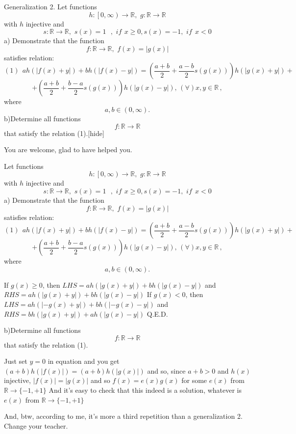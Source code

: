 \begin{solution}Generalization 2.
Let functions \[h:\left[ 0,\infty  \right)\to \mathbb{R},\,\,g:\mathbb{R}\to \mathbb{R}\] with $h$ injective and   \[s:\mathbb{R}\to \mathbb{R},\,\,s(x)=1\ \ \ ,\,\,if\,\ x\ge 0,s(x)=-1,\,\,if\ \ x<0\]
a) Demonstrate that the function \[f:\mathbb{R}\to \mathbb{R},\,\,f(x)=\left| g(x) \right|\] satisfies relation:
   \[\left( 1 \right)\ \ ah\left( \left| f(x)+y \right| \right)+bh\left( \left| f(x)-y \right| \right)=\left( \frac{a+b}{2}+\frac{a-b}{2}s\left( g(x) \right) \right)h\left( \left| g(x)+y \right| \right)+\]
\[+\left( \frac{a+b}{2}+\frac{b-a}{2}s\left( g(x) \right) \right)h\left( \left| g(x)-y \right| \right),\,\left( \forall  \right)x,y\in \mathbb{R}\,,\] 
   where \[a,b\in (0,\infty ).\]
b)Determine all functions \[f:\mathbb{R}\to \mathbb{R}\] that satisfy the relation (1).[\/hide]
\end{solution}



\begin{solution}
	You are welcome, glad to have helped you.

\begin{tcolorbox}Let functions \[h:\left[ 0,\infty  \right)\to \mathbb{R},\,\,g:\mathbb{R}\to \mathbb{R}\] with $h$ injective and   \[s:\mathbb{R}\to \mathbb{R},\,\,s(x)=1\ \ \ ,\,\,if\,\ x\ge 0,s(x)=-1,\,\,if\ \ x<0\]
a) Demonstrate that the function \[f:\mathbb{R}\to \mathbb{R},\,\,f(x)=\left| g(x) \right|\] satisfies relation:
   \[\left( 1 \right)\ \ ah\left( \left| f(x)+y \right| \right)+bh\left( \left| f(x)-y \right| \right)=\left( \frac{a+b}{2}+\frac{a-b}{2}s\left( g(x) \right) \right)h\left( \left| g(x)+y \right| \right)+\]
\[+\left( \frac{a+b}{2}+\frac{b-a}{2}s\left( g(x) \right) \right)h\left( \left| g(x)-y \right| \right),\,\left( \forall  \right)x,y\in \mathbb{R}\,,\] 
   where \[a,b\in (0,\infty ).\]
\end{tcolorbox}
If $g(x)\ge 0$, then $LHS=ah(|g(x)+y|)+bh(|g(x)-y|)$ and $RHS=ah(|g(x)+y|)+bh(|g(x)-y|)$
If $g(x)< 0$, then $LHS=ah(|-g(x)+y|)+bh(|-g(x)-y|)$ and $RHS=bh(|g(x)+y|)+ah(|g(x)-y|)$
Q.E.D.

\begin{tcolorbox}b)Determine all functions \[f:\mathbb{R}\to \mathbb{R}\] that satisfy the relation (1).\end{tcolorbox}
Just set $y=0$ in equation and you get $(a+b)h(|f(x)|)=(a+b)h(|g(x)|)$ and so, since $a+b>0$ and $h(x)$ injective, $|f(x)|=|g(x)|$ and so $f(x)=e(x)g(x)$ for some $e(x)$ from $\mathbb R\to\{-1,+1\}$
And it's easy to check that this indeed is a solution, whatever is $e(x)$ from $\mathbb R\to\{-1,+1\}$


And, btw, according to me, it's more a third repetition than a generalization 2.
Change your teacher.
\end{solution}



